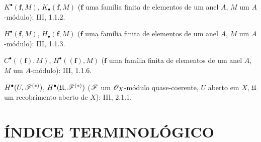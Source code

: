 \begin{flushleft}
$K^\bullet(\mathbf f,M)$, $K_\bullet(\mathbf f,M)$ ($\mathbf f$ uma família
finita de elementos de um anel $A$, $M$ um $A$-módulo): III, 1.1.2.

$H^\bullet(\mathbf f,M)$, $H_\bullet(\mathbf f,M)$ ($\mathbf f$ uma família
finita de elementos de um anel $A$, $M$ um $A$-módulo): III, 1.1.3.

$C^\bullet((\mathbf f),M)$, $H^\bullet((\mathbf f),M)$ ($\mathbf f$ uma
família finita de elementos de um anel $A$, $M$ um $A$-módulo): III, 1.1.6.

$H^\bullet(U,\mathscr{F}^{(*)})$,
$H^\bullet(\mathfrak U,\mathscr{F}^{(*)})$ ($\mathscr{F}$ um
$\mathscr{O}_X$-módulo quase-coerente, $U$ aberto em $X$, $\mathfrak U$ um recobrimento aberto de $X$):
III, 2.1.1.
\end{flushleft}

\clearpage
{}
\section*{ÍNDICE TERMINOLÓGICO}

